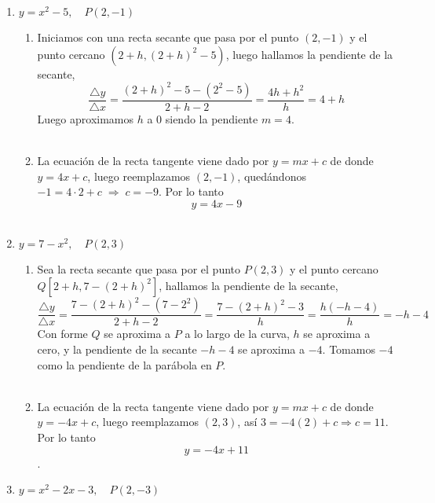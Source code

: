 \begin{enumerate}
\item $y = x^2 - 5, \quad P(2,-1)$

\begin{enumerate}[\bfseries a)]
    
    \item Iniciamos con una recta secante que pasa por el punto $(2,-1)$ y el punto cercano $(2+h,(2+h)^2 - 5)$, luego hallamos la pendiente de la secante, $$\dfrac{\triangle y}{\triangle x} = \dfrac{(2+h)^2 - 5 - (2^2 - 5)}{2+h - 2} = \dfrac{4h+h^2}{h} = 4+h$$ 
    Luego aproximamos  $h$ a $0$ siendo la pendiente $m=4$.\\\\

    \item La ecuación de la recta tangente viene dado por $y=mx + c$  de donde $y=4x+c$, luego reemplazamos $(2,-1)$, quedándonos $-1=4\cdot 2 + c \; \Longrightarrow\; c = -9$. Por lo tanto $$y=4x-9$$\\

\end{enumerate}

\item $y=7-x^2, \quad P(2,3)$ 

\begin{enumerate}[\bfseries a)]
    
    \item Sea la recta secante que pasa por el punto $P(2,3)$ y el punto cercano $Q\left[2+h,7-(2+h)^2\right]$, hallamos la pendiente de la secante, $$\dfrac{\triangle y}{\triangle x} = \dfrac{7-(2+h)^2 - (7-2^2)}{2+h-2} = \dfrac{7-(2+h)^2 - 3}{h} = \dfrac{h(-h-4)}{h} = -h-4$$
    Con forme $Q$ se aproxima a $P$ a lo largo de la curva, $h$ se aproxima a cero, y la pendiente de la secante $-h-4$ se aproxima a $-4$. Tomamos $-4$ como la pendiente de la parábola en $P$.\\\\

    \item La ecuación de la recta tangente viene dado por $y = mx + c$ de donde $y=-4x+c$, luego reemplazamos $(2,3)$, así $3 = -4(2) + c \Longrightarrow c = 11$. Por lo tanto $$y = -4x + 11$$.\\

\end{enumerate}

\item $y=x^2-2x-3, \quad P(2,-3)$


\end{enumerate}
